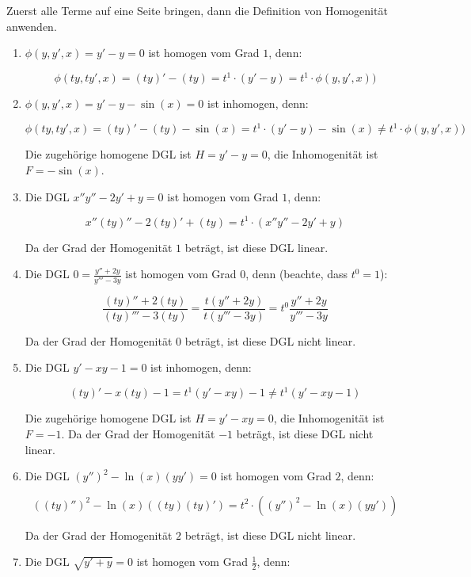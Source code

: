 \item Zuerst alle Terme auf eine Seite bringen, dann die Definition von Homogenität anwenden.

\begin{enumerate}

\item $\phi(y,y',x) = y'-y = 0$ ist homogen vom Grad $1$, denn:

$$\phi(ty,ty',x) = (ty)'-(ty) = t^1\cdot(y'-y) = t^1\cdot\phi(y,y',x))$$

\item $\phi(y,y',x) = y'-y-\sin(x) = 0$ ist inhomogen, denn:

$$\phi(ty,ty',x) = (ty)'-(ty)-\sin(x) = t^1 \cdot(y'-y) -\sin(x) \ne t^1\cdot\phi(y,y',x))$$

Die zugehörige homogene DGL ist $H = y'-y = 0$, die Inhomogenität ist $F=-\sin(x)$.

\item Die DGL $x''y''-2y'+y=0$ ist homogen vom Grad $1$, denn:

$$x''(ty)''-2(ty)'+(ty) = t^1\cdot(x''y''-2y'+y)$$

Da der Grad der Homogenität $1$ beträgt, ist diese DGL linear.

\item Die DGL $0=\frac{y''+2y}{y'''-3y}$ ist homogen vom Grad $0$, denn (beachte, dass $t^0=1$):

$$\frac{(ty)''+2(ty)}{(ty)'''-3(ty)} = \frac{t(y''+2y)}{t(y'''-3y)} = t^0 \frac{y''+2y}{y'''-3y}$$

Da der Grad der Homogenität $0$ beträgt, ist diese DGL nicht linear.

\item Die DGL $y'-xy-1=0$ ist inhomogen, denn:

$$(ty)'-x(ty)-1=t^1 (y'-xy)-1 \ne t^1 (y'-xy-1)$$

Die zugehörige homogene DGL ist $H = y'-xy=0$, die Inhomogenität ist $F = -1$. Da der Grad der Homogenität $-1$ beträgt, ist diese DGL nicht linear.

\item Die DGL $(y'')^2-\ln(x)(yy') = 0$ ist homogen vom Grad $2$, denn:

$$((ty)'')^2-\ln(x)((ty)(ty)') = t^2\cdot((y'')^2-\ln(x)(yy'))$$

Da der Grad der Homogenität $2$ beträgt, ist diese DGL nicht linear.

\item Die DGL $\sqrt{y'+y}=0$ ist homogen vom Grad $\frac{1}{2}$, denn:


\end{enumerate}
